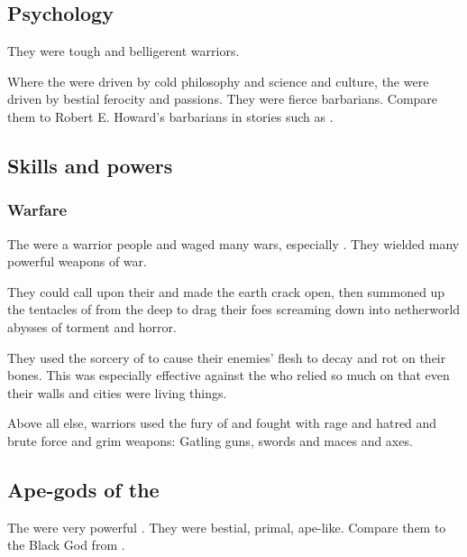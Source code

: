 \subsection{Psychology}
They were tough and belligerent warriors. 

Where the \ophidians were driven by cold philosophy and science and culture, the \aryothim were driven by bestial ferocity and passions. 
They were fierce barbarians. 
Compare them to Robert E. Howard's barbarians in stories such as \cite{RobertEHoward:TheValleyoftheLost}. 









\subsection{Skills and powers}





\subsubsection{Warfare}
The \aryoth were a warrior people and waged many wars, especially .
They wielded many powerful weapons of war. 

They could call upon their  and made the earth crack open, then summoned up the tentacles of  from the deep to drag their foes screaming down into netherworld abysses of torment and horror. 

They used the sorcery of \Yagnathul to cause their enemies' flesh to decay and rot on their bones.
This was especially effective against the \ophidians who relied so much on  that even their walls and cities were living things.

Above all else, \Aryoth warriors used the fury of \Malgaddon and fought with rage and hatred and brute force and grim weapons: Gatling guns, swords and maces and axes. 









\subsection{Ape-gods of the \aryothim}
The  were very powerful \aryothim. 
They were bestial, primal, ape-like. 
Compare them to the Black God from \cite{RobertEHoward:RedShadows}.

